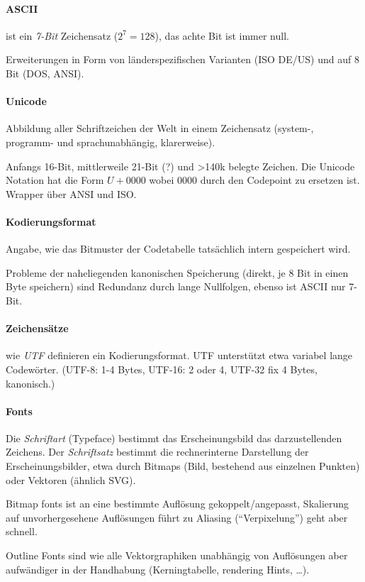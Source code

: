 \documentclass[twocolumn]{article}
\begin{document}
\paragraph{ASCII} ist ein \emph{7-Bit} Zeichensatz ($2^7 = 128$), das achte Bit ist immer null.

Erweiterungen in Form von länderspezifischen Varianten (ISO DE/US) und auf 8 Bit (DOS, ANSI).

\paragraph{Unicode} Abbildung aller Schriftzeichen der Welt in einem Zeichensatz (system-, programm- und sprachunabhängig, klarerweise).

Anfangs 16-Bit, mittlerweile 21-Bit (?) und >140k belegte Zeichen. Die Unicode Notation hat die Form $U+0000$ wobei $0000$ durch den Codepoint zu ersetzen ist. Wrapper über ANSI und ISO.

\paragraph{Kodierungsformat} Angabe, wie das Bitmuster der Codetabelle tatsächlich intern gespeichert wird.

Probleme der naheliegenden kanonischen Speicherung (direkt, je 8 Bit in einen Byte speichern) sind Redundanz durch lange Nullfolgen, ebenso ist ASCII nur 7-Bit.

\paragraph{Zeichensätze} wie \emph{UTF} definieren ein Kodierungsformat. UTF unterstützt etwa variabel lange Codewörter. (UTF-8: 1-4 Bytes, UTF-16: 2 oder 4, UTF-32 fix 4 Bytes, kanonisch.)

\paragraph{Fonts} Die \emph{Schriftart} (Typeface) bestimmt das Erscheinungsbild das darzustellenden Zeichens. Der \emph{Schriftsatz} bestimmt die rechnerinterne Darstellung der Erscheinungsbilder, etwa durch Bitmaps (Bild, bestehend aus einzelnen Punkten) oder Vektoren (ähnlich SVG).

Bitmap fonts ist an eine bestimmte Auflösung gekoppelt/angepasst, Skalierung auf unvorhergesehene Auflösungen führt zu Aliasing (\enquote{Verpixelung}) geht aber schnell.

Outline Fonts sind wie alle Vektorgraphiken unabhängig von Auflösungen aber aufwändiger in der Handhabung (Kerningtabelle, rendering Hints, \ldots).
\end{document}
